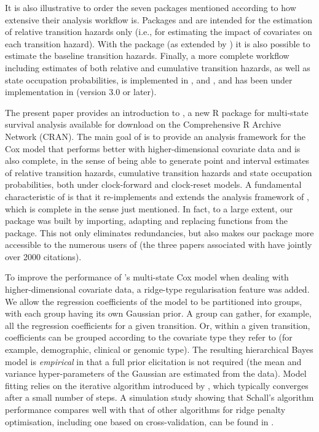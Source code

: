It is also illustrative to order the seven packages mentioned according to how extensive their analysis workflow is. Packages  and  are intended for the estimation of relative transition hazards  only (i.e., for estimating the impact of covariates on each transition hazard). With the package  (as extended by ) it is also possible to estimate the baseline transition hazards. Finally, a more complete workflow including estimates of both relative and cumulative transition hazards, as well as state occupation probabilities, is implemented in ,  and , and has been under implementation in  (version 3.0 or later).


The present paper provides an introduction to , a new R package for multi-state survival analysis available for download on the Comprehensive R Archive Network (CRAN).
The main goal of  is to provide an analysis framework for the Cox model that performs better with higher-dimensional covariate data and is also complete, in the sense of being able to generate point and interval estimates of relative transition hazards, cumulative transition hazards and state occupation probabilities, both under clock-forward and clock-reset models. 
 A fundamental characteristic of  is that it re-implements and extends the analysis framework of ,  which is complete in the sense just mentioned.  In fact,  to a large extent,  our package was built by importing, adapting and replacing functions from the  package. This not only eliminates redundancies, but also makes our package more accessible to the numerous users of  (the three papers associated with  have jointly over 2000 citations). 
 
To improve the performance of 's multi-state Cox model when dealing with higher-dimensional covariate data, a ridge-type regularisation feature was added.  We allow the  regression coefficients of the model to be partitioned into groups, with each group having its own Gaussian prior. A group can gather, for example, all the regression coefficients for a given transition. Or, within a given transition,  coefficients can be grouped according to the covariate type they refer to  (for example, demographic, clinical or genomic type).
  The resulting hierarchical Bayes model is \textit{empirical} in that a full prior elicitation is not required (the mean and variance hyper-parameters of the Gaussian are estimated from the data). Model fitting relies on the iterative algorithm introduced by \citet{Schall1991}, which typically converges after a small number of steps. A simulation study  showing that Schall's algorithm performance compares well with that of other algorithms for ridge penalty optimisation, including one based on cross-validation, can be found in \citet{Perperoglou2014}.

